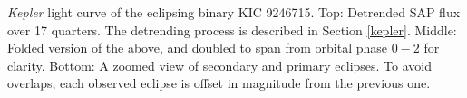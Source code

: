 \label{fig:keplerfig} \emph{Kepler} light curve of the eclipsing binary KIC 9246715. Top: Detrended SAP flux over 17 quarters. The detrending process is described in Section \ref{kepler}. Middle: Folded version of the above, and doubled to span from orbital phase $0-2$ for clarity. Bottom: A zoomed view of secondary and primary eclipses. To avoid overlaps, each observed eclipse is offset in magnitude from the previous one.